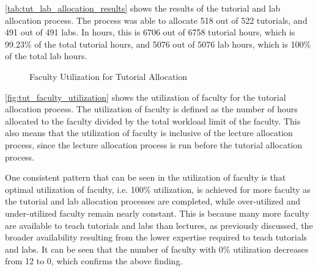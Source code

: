 \autoref{tab:tut_lab_allocation_results} shows the results of the tutorial and lab allocation process. The process was able to allocate 518 out of 522 tutorials, and 491 out of 491 labs. In hours, this is 6706 out of 6758 tutorial hours, which is 99.23\% of the total tutorial hours, and 5076 out of 5076 lab hours, which is 100\% of the total lab hours.

\begin{figure}[H]
  \centering

  \caption{Faculty Utilization for Tutorial Allocation}
  \label{fig:tut_faculty_utilization}
\end{figure}

\autoref{fig:tut_faculty_utilization} shows the utilization of faculty for the tutorial allocation process. The utilization of faculty is defined as the number of hours allocated to the faculty divided by the total workload limit of the faculty. This also means that the utilization of faculty is inclusive of the lecture allocation process, since the lecture allocation process is run before the tutorial allocation process.

One consistent pattern that can be seen in the utilization of faculty is that optimal utilization of faculty, i.e. 100\% utilization, is achieved for more faculty as the tutorial and lab allocation processes are completed, while over-utilized and under-utilized faculty remain nearly constant. This is because many more faculty are available to teach tutorials and labs than lectures, as previously discussed, the broader availability resulting from the lower expertise required to teach tutorials and labs. It can be seen that the number of faculty with 0\% utilization decreases from 12 to 0, which confirms the above finding.

